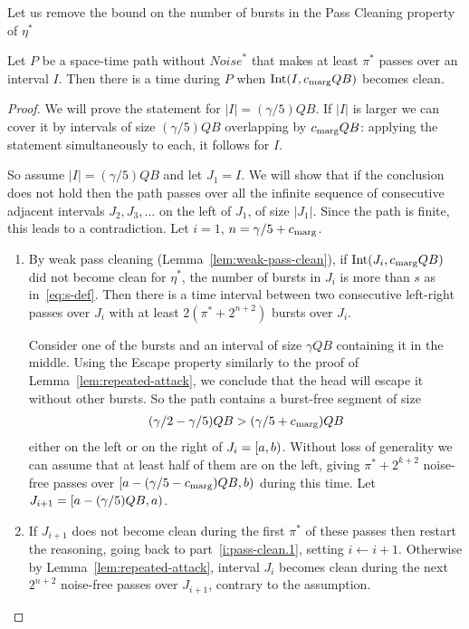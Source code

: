 \documentclass[11pt]{memoir}
\theoremstyle{definition} %
\def\B{B}
\newcommand{\Int}{\mathrm{Int}} %
\newcommand{\Noise}{\mathit{Noise}}
\newcommand{\passno}{\pi}
\newcommand{\Q}{Q} %
\newcommand{\s}{s} %
\newcommand{\cns}[1]{c_{\textrm{\upshape #1}}}
\newcommand{\CMarg}{\cns{marg}}
\begin{document}
Let us remove the bound on the number of bursts
in the Pass Cleaning property of \( \eta^{*} \)

\begin{lemma}\label{lem:pass-clean}
  Let \( P \) be a space-time path without \( \Noise^{*} \) that makes
  at least \( \passno^{*} \) passes over an interval \( I \).
  Then there is a time during \( P \) when \( \Int(I,\CMarg\Q\B) \) becomes clean.
\end{lemma}
\begin{proof}
  We will prove the statement for \( |I|=(\gamma/5)\Q\B \).
  If \( |I| \) is larger we can cover it by intervals of size \( (\gamma/5)\Q\B \)
  overlapping by \( \CMarg\Q\B \): applying the statement simultaneously to each,
  it follows for \( I \).
  
  So assume \( |I|=(\gamma/5)\Q\B \) and let \( J_{1}= I \).
  We will show that if the conclusion does not hold then the path passes over all the
  infinite sequence of consecutive adjacent intervals  \( J_{2},J_{3},\dots \) 
  on the left of \( J_{1} \), of size \( |J_{1}| \).
  Since the path is finite, this leads to a contradiction.
Let \( i=1 \), \( n=\gamma/5+\CMarg \).

   \begin{enumerate}
  \item\label{i:pass-clean.1}
  By weak pass cleaning (Lemma~\ref{lem:weak-pass-clean}),
  if \( \Int(J_{i},\CMarg\Q\B) \) did not become clean for \( \eta^{*} \),
  the number of bursts
  in \( J_{i} \) is more than \( \s \) as in~\eqref{eq:s-def}.
  Then there is a time interval between two consecutive left-right passes over \( J_{i} \)
  with at least \( 2(\passno^{*}+2^{n+2}) \) bursts over \( J_{i} \).

  Consider one of the bursts and an interval of size \( \gamma\Q\B \) containing it in the middle.
  Using the Escape property similarly to the proof of Lemma~\ref{lem:repeated-attack},
  we conclude that the head will escape it without other bursts.
  So the path contains a burst-free segment of size 
\begin{align*}
 (\gamma/2-\gamma/5)\Q\B > (\gamma/5+\CMarg)\Q\B
\end{align*}
  either on the left or on the right of \( J_{i}=\left[a,b\right) \).
  Without loss of generality we can assume that at least half of them are on the left, giving
  \( \passno^{*}+2^{k+2} \)  noise-free passes over
  \( \lint{a-(\gamma/5-\CMarg)\Q\B}{b} \) during this time.
  Let \( J_{i+1}=\lint{a-(\gamma/5)\Q\B}{a} \).
  \item\label{i:first-choice} If  \( J_{i+1} \)
    does not become clean during the first \( \passno^{*} \) of these passes
  then restart the reasoning, going back to part~\ref{i:pass-clean.1}, setting \( i\gets i+1 \).
  Otherwise by Lemma~\ref{lem:repeated-attack},
  interval \( J_{i} \) becomes clean during the next \( 2^{n+2} \)
  noise-free passes over \( J_{i+1} \), contrary to the assumption.
\end{enumerate}
\end{proof}
\end{document}
